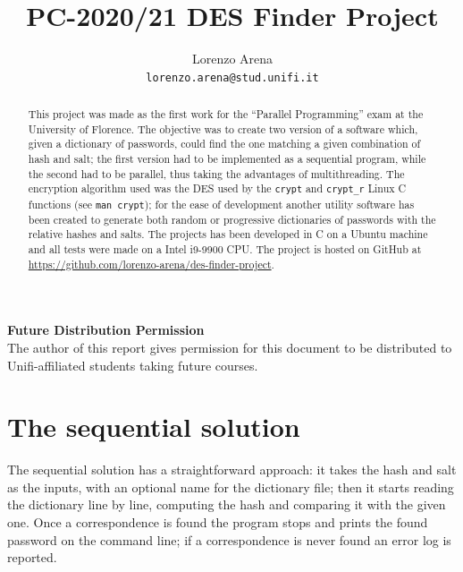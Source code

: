\documentclass[10pt,twocolumn,letterpaper]{article}
\begin{document}
\title{PC-2020/21 DES Finder Project}

\author{Lorenzo Arena\\
{\tt\small lorenzo.arena@stud.unifi.it}
}

\maketitle
\thispagestyle{empty}

\begin{abstract}
    This project was made as the first work for the “Parallel Programming” exam
    at the University of Florence. The objective was to create two version of
    a software which, given a dictionary of passwords, could find the one matching
    a given combination of hash and salt; the first version had to be implemented
    as a sequential program, while the second had to be parallel, thus taking the
    advantages of multithreading.
    The encryption algorithm used was the DES used by the \verb|crypt| and
    \verb|crypt_r| Linux C functions (see \verb|man crypt|); for the ease of
    development another utility software has been created to generate both random
    or progressive dictionaries of passwords with the relative hashes and salts.
    The projects has been developed in C on a Ubuntu machine and all tests were made
    on a Intel i9-9900 CPU.
    The project is hosted on GitHub at
    \url{https://github.com/lorenzo-arena/des-finder-project}.
 \end{abstract}

\noindent\large\textbf{Future Distribution Permission}\\
\indent The author of this report gives permission for this document to be
        distributed to Unifi-affiliated students taking future courses.

\section{The sequential solution}

    The sequential solution has  a straightforward approach: it takes the hash
    and salt as the inputs, with an optional name for the dictionary file; then
    it starts reading the dictionary line by line, computing the hash and comparing
    it with the given one. Once a correspondence is found the program stops and
    prints the found password on the command line; if a correspondence is never
    found an error log is reported.
\end{document}
